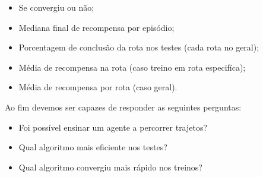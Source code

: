 \begin{itemize}
   \item Se convergiu ou não;
   \item Mediana final de recompensa por episódio;
   \item Porcentagem de conclusão da rota nos testes (cada rota no geral);
   \item Média de recompensa na rota (caso treino em rota especifíca);
   \item Média de recompensa por rota (caso geral).
\end{itemize}


Ao fim devemos ser capazes de responder as seguintes perguntas:
\begin{itemize}
   \item Foi possível ensinar um agente a percorrer trajetos?
   \item Qual algoritmo mais eficiente nos testes? 
   \item Qual algoritmo convergiu mais rápido nos treinos?
\end{itemize}